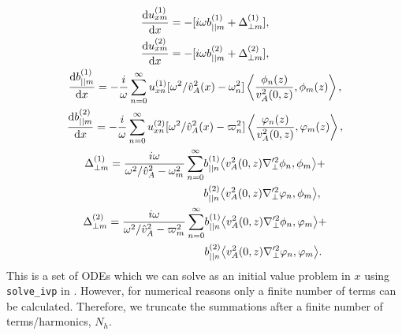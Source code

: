\begin{gather}
    \label{eq:oblique_field_ux1_numerical}
    \dv{u_{xm}^{(1)}}{x} = -[i\omega b_{||m}^{(1)} + \Delta_{\perp m}^{(1)}], \\
    \dv{u_{xm}^{(2)}}{x} = -[i\omega b_{||m}^{(2)} + \Delta_{\perp m}^{(2)}], \\
    \dv{b_{||m}^{(1)}}{x} = -\frac{i}{\omega}\sum_{n=0}^\infty u_{xn}^{(1)}[\omega^2/\hat{v}_A^2(x)-\omega_n^2]\left\langle\frac{\phi_n(z)}{v_A^2(0,z)},\phi_m(z)\right\rangle, \\
    \dv{b_{||m}^{(2)}}{x} = -\frac{i}{\omega}\sum_{n=0}^\infty u_{xn}^{(2)}[\omega^2/\hat{v}_A^2(x)-\varpi_n^2]\left\langle\frac{\varphi_n(z)}{v_A^2(0,z)},\varphi_m(z)\right\rangle, \\
    \begin{aligned}
    \Delta_{\perp m}^{(1)} = \frac{i\omega}{\omega^2/\hat{v}_A^2-\omega_m^2}\sum_{n=0}^\infty &b_{||n}^{(1)}\big\langle v_A^2(0,z) \nabla_\perp'^2\phi_n,\phi_m\big\rangle + \\
    &b_{||n}^{(2)}\big\langle v_A^2(0,z) \nabla_\perp'^2\varphi_n,\phi_m\big\rangle,
    \end{aligned} \\
    \label{eq:oblique_field_Delta_perp2_numerical}
    \begin{aligned}
    \Delta_{\perp m}^{(2)} = \frac{i\omega}{\omega^2/\hat{v}_A^2-\varpi_m^2}\sum_{n=0}^\infty & b_{||n}^{(1)}\big\langle v_A^2(0,z) \nabla_\perp'^2\phi_n,\varphi_m\big\rangle+\\
    &b_{||n}^{(2)}\big\langle v_A^2(0,z) \nabla_\perp'^2\varphi_n,\varphi_m\big\rangle.
    \end{aligned}
\end{gather}
This is a set of ODEs which we can solve as an initial value problem in $x$ using \texttt{solve\_ivp} in \citet{SciPy2020}. However, for numerical reasons only a finite number of terms can be calculated. Therefore, we truncate the summations after a finite number of terms/harmonics, $N_h$.

